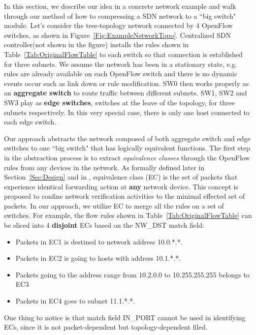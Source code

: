 In this section, we describe our idea in a concrete network example and
walk through our method of how to compressing a SDN network to a ``big switch" module.
Let's consider the tree-topology network connected by 4 OpenFlow switches,
as shown in Figure~\ref{Fig:ExampleNetworkTopo}.
Centralized SDN controller(not shown in the figure) installs the rules shown in
Table~\ref{Tab:OriginalFlowTable} to each switch so that connection is established
for three subnets.
We assume the network has been in a stationary state, e.g. rules are already available
on each OpenFlow switch and there is no dynamic events occur such as link down
or rule modification.
SW0 then works properly as an \textbf{aggregate switch} to route traffic
between different subnets.
SW1, SW2 and SW3 play as \textbf{edge switches}, switches at the leave of the topology,
for three subnets respectively.
In this very special case, there is only one host connected to each edge switch.

Our approach abstracts the network composed of both aggregate switch and edge switches
to one ``big switch" that has logically equivalent functions.
The first step in the abstraction process is to extract \textit{equivalence classes}
through the OpenFlow rules from any devices in the network.
As formally defined later in Section~\ref{Sec:Design} and in \cite{Veriflow}, equivalence class (EC) is
the set of packets that experience identical forwarding action at \textbf{any} network device.
This concept is proposed to confine network verification activities to the minimal
effected set of packets\cite{Veriflow}.
In our approach, we utilize EC to merge all the rules on a set of switches.
For example, the flow rules shown in Table~\ref{Tab:OriginalFlowTable} can be sliced into
4 \textbf{disjoint} ECs based on the NW\_DST match field:
\begin{itemize}
\item Packets in EC1 is destined to network address 10.0.*.*.
\item Packets in EC2 is going to hosts with address 10.1.*.*.
\item Packets going to the address range from 10.2.0.0 to 10.255.255.255 belongs to EC3
\item Packets in EC4 goes to subnet 11.1.*.*. 
\end{itemize}
One thing to notice is that match field IN\_PORT cannot be used in identifying ECs,
since it is not packet-dependent but topology-dependent filed.

